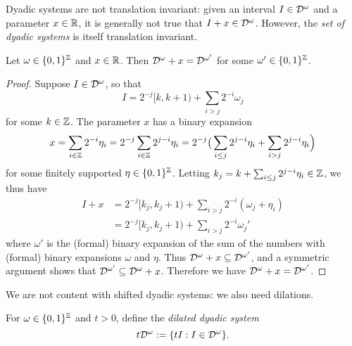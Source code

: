 Dyadic systems are not translation invariant: given an interval $I \in \mathcal{D}^{\omega}$ and a parameter $x \in \mathbb{R}$, it is generally not true that $I + x \in \mathcal{D}^{\omega}$.
However, the \emph{set of dyadic systems} is itself translation invariant.

\begin{prop}
  Let $\omega \in \{0,1\}^{\mathbb{Z}}$ and $x \in \mathbb{R}$.
  Then $\mathcal{D}^{\omega} + x = \mathcal{D}^{\omega'}$ for some $\omega' \in \{0,1\}^{\mathbb{Z}}$.
\end{prop}

\begin{proof}
  Suppose $I \in \mathcal{D}^{\omega}$, so that
  \begin{equation*}
    I = 2^{-j}[k, k+1) + \sum_{i > j} 2^{-i} \omega_{j}
  \end{equation*}
  for some $k \in \mathbb{Z}$.
  The parameter $x$ has a binary expansion
  \begin{equation*}
    x = \sum_{i \in \mathbb{Z}} 2^{-i} \eta_{i}
    = 2^{-j} \sum_{i \in \mathbb{Z}} 2^{j-i}\eta_{i}
    = 2^{-j} \big( \sum_{i \leq j} 2^{j-i}\eta_{i} + \sum_{i > j} 2^{j-i}\eta_{i} \Big) 
  \end{equation*}
  for some finitely supported $\eta \in \{0,1\}^{\mathbb{Z}}$.
  Letting $k_{j} = k + \sum_{i \leq j} 2^{j-i} \eta_{i} \in \mathbb{Z}$, we thus have
  \begin{equation*}
    \begin{aligned}
      I + x &= 2^{-j}[k_{j}, k_{j} + 1) + \sum_{i > j} 2^{-i} (\omega_{j} + \eta_{i}) \\
      &= 2^{-j}[k_{j}, k_{j} + 1) + \sum_{i > j} 2^{-i} \omega_{j}'
    \end{aligned}
  \end{equation*}
  where $\omega'$ is the (formal) binary expansion of the sum of the numbers with (formal) binary expansions $\omega$ and $\eta$.
  Thus $\mathcal{D}^{\omega} + x \subseteq \mathcal{D}^{\omega'}$, and a symmetric argument shows that $\mathcal{D}^{\omega'} \subseteq \mathcal{D}^{\omega} + x$.
  Therefore we have $\mathcal{D}^{\omega} + x = \mathcal{D}^{\omega'}$.
\end{proof}

We are not content with shifted dyadic systems: we also need dilations.

\begin{defn}
  For $\omega \in \{0,1\}^{\mathbb{Z}}$ and $t > 0$, define the \emph{dilated dyadic system}
  \begin{equation*}
    t\mathcal{D}^{\omega} := \{tI : I \in \mathcal{D}^{\omega}\}.
  \end{equation*}
\end{defn}

